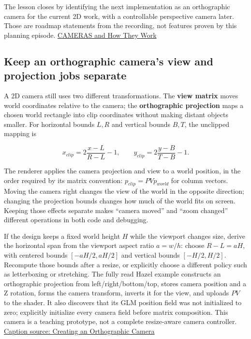 The lesson closes by identifying the next implementation as an orthographic camera for the current 2D work, with a controllable perspective camera later. Those are roadmap statements from the recording, not features proven by this planning episode. \href{https://www.youtube.com/watch?v=LfbqtmqxX04&t=2220s}{CAMERAS and How They Work}

\subsection{Keep an orthographic camera's view and projection jobs separate}\label{06-engine-ii-ch026-keep-an-orthographic-cameras-view-and-projection-jobs-separate}

\hypertarget{06-engine-ii-ch026-keep-an-orthographic-cameras-view-and-projection-jobs-separate}{}

A 2D camera still uses two different transformations. The \textbf{view matrix} moves world coordinates relative to the camera; the \textbf{orthographic projection} maps a chosen world rectangle into clip coordinates without making distant objects smaller. For horizontal bounds \(L,R\) and vertical bounds \(B,T\), the unclipped mapping is

\[
x_{clip}=2\frac{x-L}{R-L}-1,\qquad y_{clip}=2\frac{y-B}{T-B}-1.
\]

The renderer applies the camera projection and view to a world position, in the order required by its matrix convention: \(p_{clip}=P V p_{world}\) for column vectors. Moving the camera right changes the view of the world in the opposite direction; changing the projection bounds changes how much of the world fits on screen. Keeping those effects separate makes ``camera moved'' and ``zoom changed'' different operations in both code and debugging.

If the design keeps a fixed world height \(H\) while the viewport changes size, derive the horizontal span from the viewport aspect ratio \(a=w/h\): choose \(R-L=aH\), with centered bounds \([-aH/2,aH/2]\) and vertical bounds \([-H/2,H/2]\). Recompute those bounds after a resize, or explicitly choose a different policy such as letterboxing or stretching. The fully read Hazel example constructs an orthographic projection from left/right/bottom/top, stores camera position and a Z rotation, forms the camera transform, inverts it for the view, and uploads \(PV\) to the shader. It also discovers that its GLM position field was not initialized to zero; explicitly initialize every camera field before matrix composition. This camera is a teaching prototype, not a complete resize-aware camera controller. \href{https://www.youtube.com/watch?v=NjKv-HWstxA}{Caption source: Creating an Orthographic Camera}

